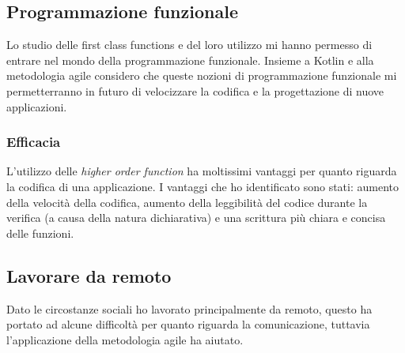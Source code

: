 \subsection{Programmazione funzionale}
Lo studio delle first class functions e del loro utilizzo mi hanno permesso di entrare nel mondo della programmazione funzionale. Insieme a Kotlin e alla metodologia agile considero che queste nozioni di programmazione funzionale mi permetterranno in futuro di velocizzare la codifica e la progettazione di nuove applicazioni.
\subsubsection*{Efficacia}
L'utilizzo delle \emph{higher order function} ha moltissimi vantaggi per quanto riguarda la codifica di una applicazione. I vantaggi che ho identificato sono stati: aumento della velocità della codifica, aumento della leggibilità del codice durante la verifica (a causa della natura dichiarativa) e una scrittura più chiara e concisa delle funzioni.

\subsection{Lavorare da remoto}
Dato le circostanze sociali ho lavorato principalmente da remoto, questo ha portato ad alcune difficoltà per quanto riguarda la comunicazione, tuttavia l'applicazione della metodologia agile ha aiutato.
